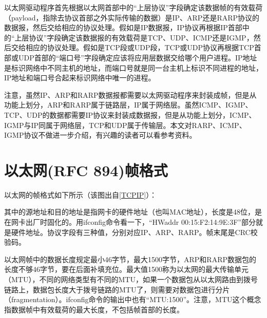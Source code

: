 

以太网驱动程序首先根据以太网首部中的“上层协议”字段确定该数据帧的有效载荷（payload，指除去协议首部之外实际传输的数据）是IP、ARP还是RARP协议的数据报，然后交给相应的协议处理。假如是IP数据报，IP协议再根据IP首部中的“上层协议”字段确定该数据报的有效载荷是TCP、UDP、ICMP还是IGMP，然后交给相应的协议处理。假如是TCP段或UDP段，TCP或UDP协议再根据TCP首部或UDP首部的“端口号”字段确定应该将应用层数据交给哪个用户进程。IP地址是标识网络中不同主机的地址，而端口号就是同一台主机上标识不同进程的地址，IP地址和端口号合起来标识网络中唯一的进程。



注意，虽然IP、ARP和RARP数据报都需要以太网驱动程序来封装成帧，但是从功能上划分，ARP和RARP属于链路层，IP属于网络层。虽然ICMP、IGMP、TCP、UDP的数据都需要IP协议来封装成数据报，但是从功能上划分，ICMP、IGMP与IP同属于网络层，TCP和UDP属于传输层。本文对RARP、ICMP、IGMP协议不做进一步介绍，有兴趣的读者可以看参考资料。




\section{以太网(RFC 894)帧格式}
%
以太网的帧格式如下所示（该图出自\hyperlink{db.bi01.bibli.tcpip}{[TCPIP]}）：




其中的源地址和目的地址是指网卡的硬件地址（也叫MAC地址），长度是48位，是在网卡出厂时固化的。用ifconfig命令看一下，“HWaddr 00:\BookSplit{}15:\BookSplit{}F2:\BookSplit{}14:\BookSplit{}9E:\BookSplit{}3F”部分就是硬件地址。协议字段有三种值，分别对应IP、ARP、RARP。帧末尾是CRC校验码。



以太网帧中的数据长度规定最小46字节，最大1500字节，ARP和RARP数据包的长度不够46字节，要在后面补填充位。最大值1500称为以太网的最大传输单元（MTU），不同的网络类型有不同的MTU，如果一个数据包从以太网路由到拨号链路上，数据包长度大于拨号链路的MTU了，则需要对数据包进行分片（fragmentation）。ifconfig命令的输出中也有“MTU:\BookSplit{}1500”。注意，MTU这个概念指数据帧中有效载荷的最大长度，不包括帧首部的长度。

